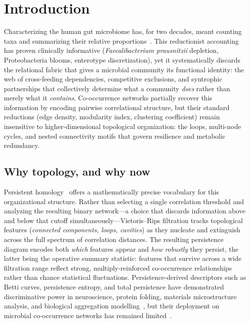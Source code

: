 \section{Introduction}
\label{sec:introduction}

Characterizing the human gut microbiome has, for two decades, meant counting
taxa and summarizing their relative proportions~\citep{hmp2012structure,
turnbaugh2007human}.
This reductionist accounting has proven clinically informative
(\textit{Faecalibacterium prausnitzii} depletion, Proteobacteria blooms,
enterotype discretization), yet it systematically discards the relational
fabric that gives a microbial community its functional identity: the web of
cross-feeding dependencies, competitive exclusions, and syntrophic partnerships
that collectively determine what a community \emph{does} rather than merely
what it \emph{contains}.
Co-occurrence networks partially recover this information by encoding pairwise
correlational structure, but their standard reductions (edge density, modularity
index, clustering coefficient) remain insensitive to higher-dimensional
topological organization: the loops, multi-node cycles, and nested connectivity
motifs that govern resilience and metabolic redundancy.

\subsection{Why topology, and why now}

Persistent homology~\citep{carlsson2009topology,edelsbrunner2008persistent}
offers a mathematically precise vocabulary for this organizational structure.
Rather than selecting a single correlation threshold and analyzing the
resulting binary network---a choice that discards information above and below
that cutoff simultaneously---Vietoris--Rips filtration tracks topological features
(\textit{connected components, loops, cavities}) as they nucleate and
extinguish across the full spectrum of correlation distances.
The resulting persistence diagram encodes both \emph{which} features appear
and \emph{how robustly} they persist, the latter being the operative
summary statistic: features that survive across a wide filtration range reflect
strong, multiply-reinforced co-occurrence relationships rather than chance
statistical fluctuations.
Persistence-derived descriptors such as Betti curves, persistence entropy,
and total persistence have demonstrated discriminative power in neuroscience,
protein folding, materials microstructure analysis, and biological aggregation
modelling~\citep{wasserman2018topological,bubenik2015statistical,ghrist2008barcodes,topaz2015topological},
but their deployment on microbial co-occurrence networks has remained
limited~\citep{camara2017topological,liao2019tmap}.

